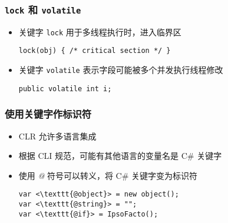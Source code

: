 \begin{frame}[fragile]
\frametitle{\texttt{lock} 和 \texttt{volatile}}
\begin{itemize}
\item 关键字 \texttt{lock} 用于多线程执行时，进入临界区
\begin{lstlisting}
lock(obj) { /* critical section */ }
\end{lstlisting}
\item 关键字 \texttt{volatile} 表示字段可能被多个并发执行线程修改
\begin{lstlisting}
public volatile int i;
\end{lstlisting}
\end{itemize}
\end{frame}

\begin{frame}[fragile]
\frametitle{使用关键字作标识符}
\begin{itemize}
\item CLR 允许多语言集成
\item 根据 CLI 规范，可能有其他语言的变量名是 C\# 关键字
\item 使用 \textit{@} 符号可以转义，将 C\# 关键字变为标识符
\begin{lstlisting}[escapeinside=<>]
var <\texttt{@object}> = new object();
var <\texttt{@string}> = "";
var <\texttt{@if}> = IpsoFacto();
\end{lstlisting}
\end{itemize}
\end{frame}




